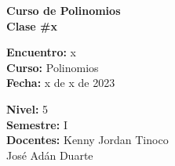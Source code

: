 \begin{center} \textbf
{
    \Large Curso de Polinomios \\ \vspace{2mm}Clase \#x
}
\end{center}

\begin{multicols}{2}
{
    \textbf{Encuentro:} x\\
    \textbf{Curso:} Polinomios\\
    \textbf{Fecha:} x de x de 2023\\
    \begin{flushright}
        \textbf{Nivel:} 5\\
        \textbf{Semestre:} I\\
        \textbf{Docentes:} Kenny Jordan Tinoco \\José Adán Duarte
    \end{flushright}
}
\end{multicols}

\thispagestyle{first-page-style}